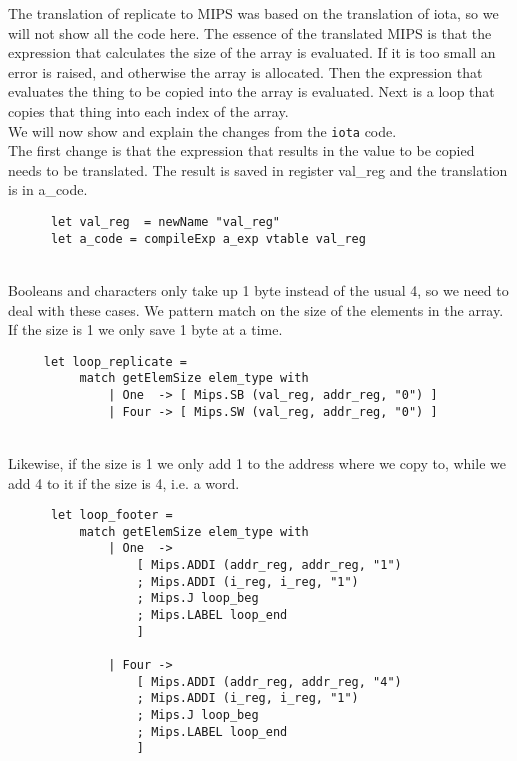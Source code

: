 The translation of replicate to MIPS was based on the translation of iota, so we will not show all the code here. The essence of the translated MIPS is that the expression that calculates the size of the array is evaluated. If it is too small an error is raised, and otherwise the array is allocated. Then the expression that evaluates the thing to be copied into the array is evaluated. Next is a loop that copies that thing into each index of the array. \\

We will now show and explain the changes from the \texttt{iota} code. \\
The first change is that the expression that results in the value to be copied needs to be translated. The result is saved in register val\_reg and the translation is in a\_code.
\begin{verbatim}
      let val_reg  = newName "val_reg"
      let a_code = compileExp a_exp vtable val_reg
\end{verbatim}
~\\

Booleans and characters only take up 1 byte instead of the usual 4, so we need to deal with these cases. We pattern match on the size of the elements in the array. If the size is 1 we only save 1 byte at a time.
\begin{verbatim}
     let loop_replicate =
          match getElemSize elem_type with
              | One  -> [ Mips.SB (val_reg, addr_reg, "0") ]
              | Four -> [ Mips.SW (val_reg, addr_reg, "0") ]
\end{verbatim}
~\\

Likewise, if the size is 1 we only add 1 to the address where we copy to, while we add 4 to it if the size is 4, i.e. a word. 
\begin{verbatim}
      let loop_footer = 
          match getElemSize elem_type with
              | One  ->
                  [ Mips.ADDI (addr_reg, addr_reg, "1")
                  ; Mips.ADDI (i_reg, i_reg, "1")
                  ; Mips.J loop_beg
                  ; Mips.LABEL loop_end
                  ]
 
              | Four ->
                  [ Mips.ADDI (addr_reg, addr_reg, "4")
                  ; Mips.ADDI (i_reg, i_reg, "1")
                  ; Mips.J loop_beg
                  ; Mips.LABEL loop_end
                  ]
\end{verbatim}
~\\

